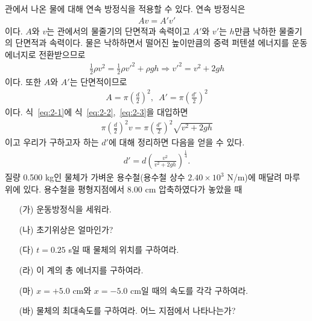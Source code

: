 \documentclass[floatfix,nofootinbib,superscriptaddress,fleqn]{revtex4-2}
\begin{document}
관에서 나온 물에 대해 연속 방정식을 적용할 수 있다. 연속 방정식은
\begin{align}\label{eq:2-1}
  Av = A'v'
\end{align}
이다. $A$와 $v$는 관에서의 물줄기의 단면적과 속력이고 
$A'$와 $v'$는 $h$만큼 낙하한 물줄기의 단면적과 속력이다.
물은 낙하하면서 떨어진 높이만큼의 중력 퍼텐셜 에너지를 운동 에너지로 전환받으므로
\begin{align}\label{eq:2-2}
  \frac{1}{2}\rho v^2 = \frac{1}{2}\rho {v'}^2 + \rho g h
  \Longrightarrow {v'}^2 = v^2 + 2gh
\end{align} 
이다. 또한 $A$와 $A'$는 단면적이므로
\begin{align}\label{eq:2-3}
  A = \pi {\left(\frac{d}{2}\right)}^2,\,\,\,
  A' = \pi {\left(\frac{d'}{2}\right)}^2
\end{align}
이다. 식~\eqref{eq:2-1}에 식~\eqref{eq:2-2},~\eqref{eq:2-3}을 대입하면
\begin{align}
  \pi {\left(\frac{d}{2}\right)}^2 v
  = \pi {\left(\frac{d'}{2}\right)}^2\sqrt{v^2 + 2gh}
\end{align}
이고 우리가 구하고자 하는 $d'$에 대해 정리하면 다음을 얻을 수 있다.
\begin{align}
  d' = d{\left(\frac{v^2}{v^2+2gh}\right)}^{\frac{1}{4}}.
\end{align}
\vspace{1.cm}
질량 0.500 kg인 물체가 가벼운 용수철(용수철 상수 $2.40\times 10^3$
N/m)에 매달려 마루 위에 있다. 용수철을 평형지점에서 8.00 cm 압축하였다가 
놓았을 때
\begin{itemize}
\item[(가)] 운동방정식을 세워라.
\item[(나)] 초기위상은 얼마인가?
\item[(다)] $t=0.25$ s일 때 물체의 위치를 구하여라.
\item[(라)] 이 계의 총 에너지를 구하여라.
\item[(마)] $x=+5.0$ cm와 $x=-5.0$ cm일 때의 속도를 각각 구하여라.
\item[(바)] 물체의 최대속도를 구하여라. 어느 지점에서 나타나는가?
 \end{itemize}
\end{document}
